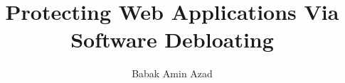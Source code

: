 \documentclass[phd,bottom,nosig]{usbthesis}
\author{Babak Amin Azad}%
\title{Protecting Web Applications Via Software Debloating}%
\begin{document}
\singlespacing %
\maketitle %
\makeapproval %

\begin{abstract}

\end{abstract}

\pagebreak
\begin{dedication}
  
\end{dedication}

\tableofcontents %
\listoffigures %
%
\listoftables %
%
\begin{acknowledgements}
    
\end{acknowledgements}
\pagestyle{thesis}
\newpage
{}







\renewcommand{\baselinestretch}{1}
\normalsize

\clearpage
\newpage
{}%
%


\clearpage
\newpage

\appendix


% 
%
\end{document}
